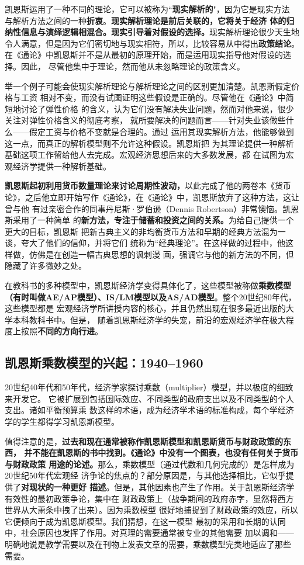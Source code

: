 凯恩斯运用了一种不同的理论，它可以被称为“\textbf{现实解析的}"，因为它是现实方法
与解析方法之间的一种\textbf{折衷}。\textbf{现实解析理论是前后关联的，它将关于经济
  体的归纳性信息与演绎逻辑相混合。现实引导着对假设的选择。}现实解析理论很少天生地
令人满意，但是因为它们密切地与现实相符，所以，比较容易从中得出\textbf{政策结论}。
在《通论》中凯恩斯并不是从最初的原理开始，而是运用现实指导他对假设的选择。因此，
尽管他集中于理论，然而他从未忽略理论的政策含义。

举一个例子可能会使现实解析理论与解析理论之间的区别更加清楚。凯恩斯假定价格与工资
相对不变，而没有试图证明这些假设是正确的。尽管他在《通论》中简短地讨论了弹性价格
的含义，认为它们没有解决失业问题，然而对他来说，很少关注对弹性价格含义的彻底考察，
就所要解决的问题而言——针对失业该做些什么——假定工资与价格不变就是合理的。通过
运用其现实解析方法，他能够做到这一点，而真正的解析模型则不允许这种假设。凯恩斯把
为其理论提供一种解析基础这项工作留给他人去完成。宏观经济思想后来的大多数发展，都
在试图为宏观经济学提供一种解析基础。

\textbf{凯恩斯起初利用货币数量理论来讨论周期性波动，}以此完成了他的两卷本《货币
论》，之后他立即开始写作《通论》，在《通论》中，凯恩斯放弃了这种方法，这让曾与他
有过亲密合作的同事丹尼斯·罗伯逊（Dennis Robertson）非常懊恼。凯恩斯采用了一种简单
的\textbf{新方法，专注于储蓄和投资之间的关系。}为给自己提供一个更大的目标，凯恩斯
把新古典主义的非均衡货币方法和早期的经典方法混为一谈，夸大了他们的信仰，并将它们
统称为“经典理论”。在这样做的过程中，他这样做，仿佛是在创造一幅古典思想的讽刺漫
画，强调它与他的新方法的不同，但隐藏了许多微妙之处。

在教科书的多种模型中，凯恩斯经济学变得具体化了，这些模型被称做\textbf{乘数模型
  （有时叫做AE/AP模型）、IS/LM模型以及AS/AD模型}。整个20世纪80年代，这些模型都是
宏观经济学所讲授内容的核心，并且仍然出现在很多最近出版的大学本科教科书中。但是，
随着凯恩斯经济学的失宠，前沿的宏观经济学在极大程度上按照\textbf{不同的方向行进}。

\subsection{凯恩斯乘数模型的兴起：1940--1960}

20世纪40年代和50年代，经济学家探讨乘数（multiplier）模型，并以极度的细致来开发它。
它被扩展到包括国际效应、不同类型的政府支出以及不同类型的个人支出。诸如平衡预算乘
数这样的术语，成为经济学术语的标准构成，每个学经济学的学生都得学习凯恩斯模型。

值得注意的是，\textbf{过去和现在通常被称作凯恩斯模型和凯恩斯货币与财政政策的东西，
  并不能在凯恩斯的书中找到。《通论》中没有一个图表，也没有任何关于货币与财政政策
  用途的论述。}那么，乘数模型（通过代数和几何完成的）是怎样成为20世纪50年代宏观经
济争论的焦点的？部分原因是，与其他选择相比，它似乎提供了\textbf{对现状的一种更好
  描述}。但是，其他因素也产生了作用。关于凯恩斯经济学有效性的最初政策争论，集中在
财政政策上（战争期间的政府赤字，显然将西方世界从大萧条中拽了出来）。因为乘数模型
很好地捕捉到了财政政策的效应，所以它便倾向于成为凯恩斯模型。我们猜想，在这一模型
最初的采用和长期的认同中，社会原因也发挥了作用。对真理的需要通常被专业的其他需要
加以调和——明确地说是教学需要以及在刊物上发表文章的需要，乘数模型完类地适应了那些
需要。

